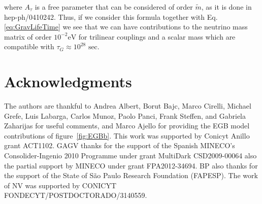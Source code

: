 \documentclass[a4paper,11pt]{article}
\begin{document}
\noindent where $A_{\tau}$ is a free parameter that can be considered
of order $\tilde{m}$, as it is done in hep-ph/0410242. Thus, if we
consider this formula together with Eq. \ref{eq:GravLifeTime} we
see that we can have contributions to the neutrino mass matrix of
order $10^{-2}\mbox{eV}$ for trilinear couplings and a scalar mass
which are compatible with $\tau_{G}\approx10^{28}\mbox{ sec}$.


\section*{Acknowledgments}

{\small 
The authors are thankful to Andrea Albert, Borut Bajc, Marco Cirelli, Michael Grefe, Luis Labarga, Carlos Munoz, Paolo Panci, Frank Steffen, and Gabriela Zaharijas for useful comments, and Marco Ajello for providing the EGB model contributions of figure~\ref{fig:EGBb}.
 This work was supported by Conicyt Anillo grant ACT1102. GAGV thanks for the support of the Spanish MINECO's Consolider-Ingenio 2010 Programme under grant MultiDark CSD2009-00064 also the partial support by MINECO under grant FPA2012-34694. BP also thanks for the support of the State of S\~{a}o Paulo Research Foundation (FAPESP). The work of NV was supported by CONICYT FONDECYT/POSTDOCTORADO/3140559.
}



\end{document}

